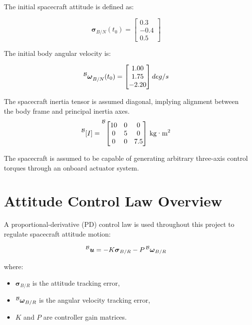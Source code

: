 \documentclass[12pt,a4paper]{report}
\begin{document}
	The initial spacecraft attitude is defined as:
	
	\[
	\boldsymbol{\sigma}_{B/N}(t_0) =
	\begin{bmatrix}
		0.3 \\
		-0.4 \\
		0.5
	\end{bmatrix}
	\]
	
	The initial body angular velocity is:
	
	\[
	{\prescript{\mathcal{B}}{}{\boldsymbol{\omega}}}_{B/N}(t_0) =
	\begin{bmatrix}
		1.00 \\
		1.75 \\
		-2.20
	\end{bmatrix}
	deg/s
	\]
	
	The spacecraft inertia tensor is assumed diagonal, implying alignment between the body frame and principal inertia axes.	
	\[
	\prescript{\mathcal{B}}{}{[I]} =
	\prescript{\mathcal{B}}{}{\begin{bmatrix}
			10 & 0 & 0 \\
			0 & 5 & 0 \\
			0 & 0 & 7.5
	\end{bmatrix}}
	\text{ kg·m}^2
	\]	
	
	The spacecraft is assumed to be capable of generating arbitrary three-axis control torques through an onboard actuator system.
	
	\section{Attitude Control Law Overview}
	
	A proportional-derivative (PD) control law is used throughout this project to regulate spacecraft attitude motion:
	
	\begin{equation}
		\prescript{\mathcal{B}}{}{\boldsymbol{u}} = -K\boldsymbol{\sigma}_{B/R} - P\prescript{\mathcal{B}}{}{\boldsymbol{\omega}}_{B/R}
	\end{equation}
	
	where:
	
	\begin{itemize}
		\item $\boldsymbol{\sigma}_{B/R}$ is the attitude tracking error,
		\item $\prescript{\mathcal{B}}{}{\boldsymbol{\omega}}_{B/R}$ is the angular velocity tracking error,
		\item $K$ and $P$ are controller gain matrices.
	\end{itemize}
	
\end{document}
